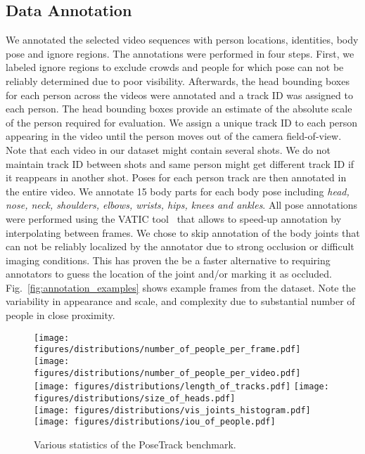 \documentclass[10pt,twocolumn,letterpaper]{article}
\begin{document}
\subsection{Data Annotation} 
We annotated the selected video sequences with person locations,
identities, body pose and ignore regions. The annotations were
performed in four steps. First, we labeled ignore regions to
exclude crowds and people for which pose can not be reliably determined due to
poor visibility. Afterwards, the head bounding boxes
for each person across the videos were annotated and a track ID was 
assigned to each person. The head bounding boxes provide an estimate
of the absolute scale of the person required for evaluation. We assign
a unique track ID to each person appearing in the video until the
person moves out of the camera field-of-view.  Note that each video in our
dataset might contain several shots. We do not maintain track ID between shots
and same person might get different track ID if it reappears in another shot. 
Poses for each person track are then annotated in the entire video. We annotate
15 body parts for each body pose including \textit{head, nose, neck, shoulders,
  elbows, wrists, hips, knees and ankles}. All pose annotations were performed
using the VATIC tool~\cite{vodrick12ijcv} that allows to speed-up annotation by
interpolating between frames. We chose to skip annotation of the body joints
that can not be reliably localized by the annotator due to strong occlusion or
difficult imaging conditions. This has proven the be a faster alternative to
requiring annotators to guess the location of the joint and/or marking it as
occluded. Fig.~\ref{fig:annotation_examples} shows example frames from the dataset. Note
the variability in appearance and scale, and complexity due to substantial number of
people in close proximity.
\begin{figure}[t]
	\centering
	\texttt{[image: figures/distributions/number\_of\_people\_per\_frame.pdf]} 
	\texttt{[image: figures/distributions/number\_of\_people\_per\_video.pdf]} 
	\hfill
	 \\
	\texttt{[image: figures/distributions/length\_of\_tracks.pdf]} 
	\texttt{[image: figures/distributions/size\_of\_heads.pdf]} 
	\hfill
	\\
	\texttt{[image: figures/distributions/vis\_joints\_histogram.pdf]} 
	\texttt{[image: figures/distributions/iou\_of\_people.pdf]} 
	\hfill
	\\
	\caption{Various statistics of the PoseTrack benchmark.}
        \vspace{-0.35cm}
	\label{fig:datastats}
\end{figure}
 
\end{document}
